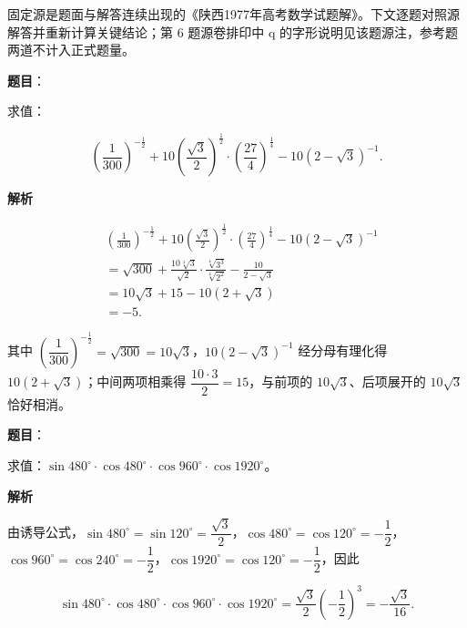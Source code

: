 

\begin{gktip}
固定源是题面与解答连续出现的《陕西1977年高考数学试题解》。下文逐题对照源解答并重新计算关键结论；第 6 题源卷排印中 q 的字形说明见该题源注，参考题两道不计入正式题量。
\end{gktip}

\begin{answer}

\textbf{题目}：

求值：

\nopagebreak[4]
\[
\left(\frac{1}{300}\right)^{-\frac12}
+10\left(\frac{\sqrt3}{2}\right)^{\frac12}\cdot\left(\frac{27}{4}\right)^{\frac14}
-10(2-\sqrt3)^{-1}.
\]

\textbf{解析}

\nopagebreak[4]
\[
\begin{aligned}
&\left(\frac{1}{300}\right)^{-\frac12}
+10\left(\frac{\sqrt3}{2}\right)^{\frac12}\cdot\left(\frac{27}{4}\right)^{\frac14}
-10(2-\sqrt3)^{-1}\\
&=\sqrt{300}
+\frac{10\sqrt[4]{3}}{\sqrt2}\cdot\frac{\sqrt[4]{3^3}}{\sqrt[4]{2^2}}
-\frac{10}{2-\sqrt3}\\
&=10\sqrt3+15-10(2+\sqrt3)\\
&=-5.
\end{aligned}
\]

其中 $\left(\dfrac{1}{300}\right)^{-\frac12}=\sqrt{300}=10\sqrt3$，$10(2-\sqrt3)^{-1}$ 经分母有理化得 $10(2+\sqrt3)$；中间两项相乘得 $\dfrac{10\cdot3}{2}=15$，与前项的 $10\sqrt3$、后项展开的 $10\sqrt3$ 恰好相消。


\end{answer}
\begin{answer}

\textbf{题目}：

求值：$\sin480^\circ\cdot\cos480^\circ\cdot\cos960^\circ\cdot\cos1920^\circ$。

\textbf{解析}

由诱导公式，$\sin480^\circ=\sin120^\circ=\dfrac{\sqrt3}{2}$，$\cos480^\circ=\cos120^\circ=-\dfrac12$，$\cos960^\circ=\cos240^\circ=-\dfrac12$，$\cos1920^\circ=\cos120^\circ=-\dfrac12$，因此

\nopagebreak[4]
\[
\sin480^\circ\cdot\cos480^\circ\cdot\cos960^\circ\cdot\cos1920^\circ
=\frac{\sqrt3}{2}\left(-\frac12\right)^3=-\frac{\sqrt3}{16}.
\]


\end{answer}
